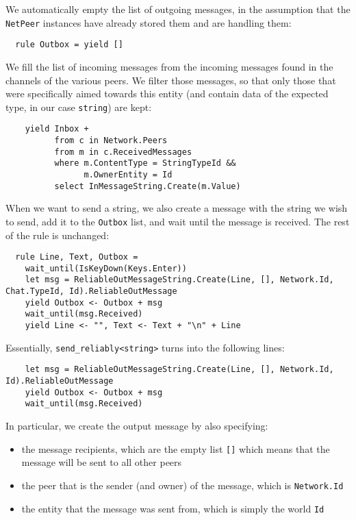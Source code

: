 We automatically empty the list of outgoing messages, in the assumption that the \texttt{NetPeer} instances have already stored them and are handling them:

\begin{lstlisting}
  rule Outbox = yield []
\end{lstlisting}

We fill the list of incoming messages from the incoming messages found in the channels of the various peers. We filter those messages, so that only those that were specifically aimed towards this entity (and contain data of the expected type, in our case \texttt{string}) are kept:

\begin{lstlisting}
    yield Inbox +
          from c in Network.Peers
          from m in c.ReceivedMessages
          where m.ContentType = StringTypeId &&
                m.OwnerEntity = Id
          select InMessageString.Create(m.Value)
\end{lstlisting}

When we want to send a string, we also create a message with the string we wish to send, add it to the \texttt{Outbox} list, and wait until the message is received. The rest of the rule is unchanged:

\begin{lstlisting}
  rule Line, Text, Outbox = 
    wait_until(IsKeyDown(Keys.Enter))
    let msg = ReliableOutMessageString.Create(Line, [], Network.Id, Chat.TypeId, Id).ReliableOutMessage
    yield Outbox <- Outbox + msg
    wait_until(msg.Received)
    yield Line <- "", Text <- Text + "\n" + Line
\end{lstlisting}

Essentially, \texttt{send\_reliably<string>} turns into the following lines:

\begin{lstlisting}
    let msg = ReliableOutMessageString.Create(Line, [], Network.Id, Id).ReliableOutMessage
    yield Outbox <- Outbox + msg
    wait_until(msg.Received)
\end{lstlisting}

In particular, we create the output message by also specifying:
\begin{itemize}
\item the message recipients, which are the empty list \texttt{[]} which means that the message will be sent to all other peers
\item the peer that is the sender (and owner) of the message, which is \texttt{Network.Id}
\item the entity that the message was sent from, which is simply the world \texttt{Id}
\end{itemize}


